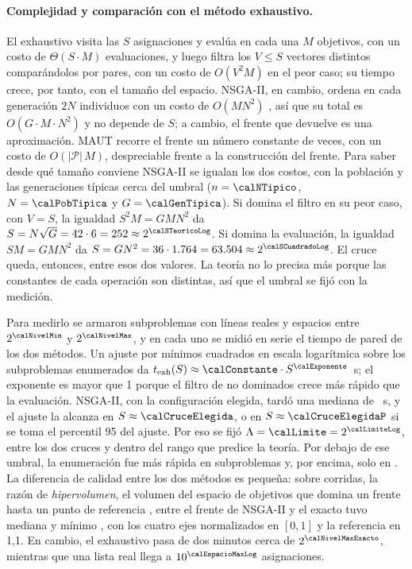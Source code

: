 \paragraph{Complejidad y comparación con el método exhaustivo.} El exhaustivo visita las $S$
asignaciones y evalúa en cada una $M$ objetivos, con un costo de $\Theta(S\cdot M)$ evaluaciones, y
luego filtra los $V\leq S$ vectores distintos comparándolos por pares, con un costo de $O(V^2M)$ en
el peor caso; su tiempo crece, por tanto, con el tamaño del espacio. NSGA-II, en cambio, ordena en
cada generación $2N$ individuos con un costo de $O(MN^2)$ \citep{deb_fast_2002}, así que su
total es $O(G\cdot M\cdot N^2)$ y no depende de $S$; a cambio, el frente que devuelve es una
aproximación. MAUT recorre el frente un número constante de veces, con un costo de
$O(|\mathcal{P}|\,M)$, despreciable frente a la construcción del frente. Para saber desde qué tamaño conviene NSGA-II se igualan los dos costos, con la población y las
generaciones típicas cerca del umbral ($n=\calNTipico$, $N=\calPobTipica$ y $G=\calGenTipica$). Si
domina el filtro en su peor caso, con $V=S$, la igualdad $S^2M=GMN^2$ da $S=N\sqrt{G}=42\cdot 6=252\approx
2^{\calSTeoricoLog}$. Si domina la evaluación, la igualdad $SM=GMN^2$ da $S=GN^2=36\cdot
1.764=63.504\approx 2^{\calSCuadradoLog}$. El cruce queda, entonces, entre esos dos valores. La
teoría no lo precisa más porque las constantes de cada operación son distintas, así que el umbral
se fijó con la medición.

Para medirlo se armaron \calSubproblemas{} subproblemas con líneas reales y espacios entre $2^{\calNivelMin}$
y $2^{\calNivelMax}$, y en cada uno se midió en serie el tiempo de pared de los dos métodos. Un
ajuste por mínimos cuadrados en escala logarítmica sobre los \calSubproblemasExacto{} subproblemas
enumerados da $t_{\mathrm{exh}}(S)\approx\calConstante\cdot S^{\calExponente}$~s; el exponente es
mayor que 1 porque el filtro de no dominados crece más rápido que la evaluación. NSGA-II, con la
configuración elegida, tardó una mediana de \calTNsgaElegidaMediana~s, y el ajuste la alcanza en
$S\approx\calCruceElegida$, o en $S\approx\calCruceElegidaP$ si se toma el percentil 95 del ajuste.
Por eso se fijó $\Lambda=\calLimite=2^{\calLimiteLog}$, entre los dos cruces y dentro del rango que
predice la teoría. Por debajo de ese umbral, la enumeración fue más rápida en
\calExactoGanaBajoElegida{} subproblemas y, por encima, solo en \calExactoGanaSobreElegida. La
diferencia de calidad entre los dos métodos es pequeña: sobre \calCorridasHV{} corridas, la razón de
\emph{hipervolumen}, el volumen del espacio de objetivos que domina un frente hasta un punto de
referencia \citep{zitzler_multiobjective_1999}, entre el frente de NSGA-II y el exacto tuvo mediana
\calRazonHVMediana{} y mínimo \calRazonHVMin, con los cuatro ejes normalizados en $[0,1]$ y la
referencia en 1,1. En cambio, el exhaustivo pasa de dos minutos cerca de $2^{\calNivelMaxExacto}$,
mientras que una lista real llega a $10^{\calEspacioMaxLog}$ asignaciones.


